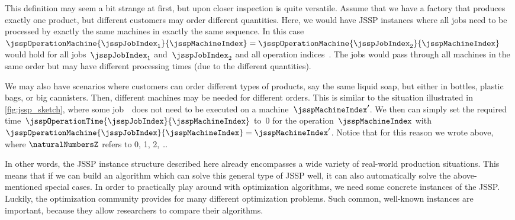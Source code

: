 This definition may seem a bit strange at first, but upon closer inspection is quite versatile.
Assume that we have a factory that produces exactly one product, but different customers may order different quantities.
Here, we would have JSSP instances where all jobs need to be processed by exactly the same machines in exactly the same sequence.
In this case~$\jsspOperationMachine{\jsspJobIndex_1}{\jsspMachineIndex}=\jsspOperationMachine{\jsspJobIndex_2}{\jsspMachineIndex}$ would hold for all jobs~$\jsspJobIndex_1$ and~$\jsspJobIndex_2$ and all operation indices~\jsspMachineIndex.
The jobs would pass through all machines in the same order but may have different processing times (due to the different quantities).

We may also have scenarios where customers can order different types of products, say the same liquid soap, but either in bottles, plastic bags, or big cannisters.
Then, different machines may be needed for different orders.
This is similar to the situation illustrated in \autoref{fig:jssp_sketch}, where some job~\jsspJobIndex\ does not need to be executed on a machine~$\jsspMachineIndex'$.
We then can simply set the required time~$\jsspOperationTime{\jsspJobIndex}{\jsspMachineIndex}$ to~0 for the operation~$\jsspMachineIndex$ with~$\jsspOperationMachine{\jsspJobIndex}{\jsspMachineIndex}=\jsspMachineIndex'$.
Notice that for this reason we wrote \inQuotes{$\jsspOperationTime{\jsspJobIndex}{\jsspMachineIndex}\in\naturalNumbersZ$} above, where $\naturalNumbersZ$ refers to 0, 1, 2, \dots\relax

In other words, the JSSP instance structure described here already encompasses a wide variety of real-world production situations.
This means that if we can build an algorithm which can solve this general type of JSSP well, it can also automatically solve the above-mentioned special cases.
\endhsection%
%
%
\label{sec:jsspBenchmarkInstances}%
In order to practically play around with optimization algorithms, we need some concrete instances of the JSSP.
Luckily, the optimization community provides  for many different optimization problems.
Such common, well-known instances are important, because they allow researchers to compare their algorithms.

